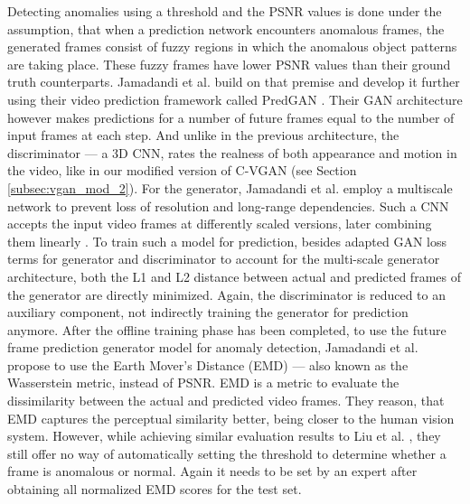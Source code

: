 Detecting anomalies using a threshold and the PSNR values is done under the assumption, that when a prediction network encounters anomalous frames, the generated frames consist of fuzzy regions in which the anomalous object patterns are taking place. These fuzzy frames have lower PSNR values than their ground truth counterparts. Jamadandi et al. build on that premise and develop it further using their video prediction framework called PredGAN \cite{jamadandi2018predgan}. Their GAN architecture however makes predictions for a number of future frames equal to the number of input frames at each step. And unlike in the previous architecture, the discriminator --- a 3D CNN, rates the realness of both appearance and motion in the video, like in our modified version of C-VGAN (see Section \ref{subsec:vgan_mod_2}). For the generator, Jamadandi et al. employ a multiscale network to prevent loss of resolution and long-range dependencies. Such a CNN accepts the input video frames at differently scaled versions, later combining them linearly \cite{mathieu2015deep}. To train such a model for prediction, besides adapted GAN loss terms for generator and discriminator to account for the multi-scale generator architecture, both the L1 and L2 distance between actual and predicted frames of the generator are directly minimized. Again, the discriminator is reduced to an auxiliary component, not indirectly training the generator for prediction anymore. After the offline training phase has been completed, to use the future frame prediction generator model for anomaly detection, Jamadandi et al. propose to use the Earth Mover's Distance (EMD) --- also known as the Wasserstein metric, instead of PSNR. EMD is a metric to evaluate the dissimilarity between the actual and predicted video frames. They reason, that EMD captures the perceptual similarity better, being closer to the human vision system. However, while achieving similar evaluation results to Liu et al. \cite{liu2018future}, they still offer no way of automatically setting the threshold to determine whether a frame is anomalous or normal. Again it needs to be set by an expert after obtaining all normalized EMD scores for the test set.


